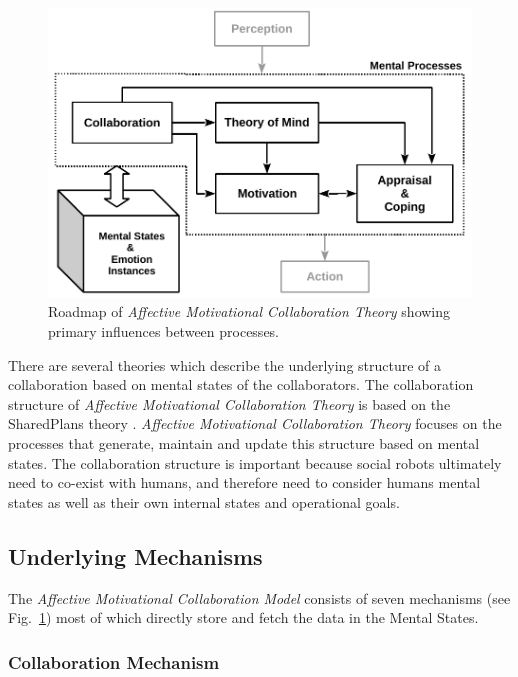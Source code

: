 \begin{figure}[h!]
  \includegraphics[scale=0.78]{figure/theory-general-croped.pdf}
  \caption{Roadmap of \textit{Affective Motivational Collaboration Theory}
  showing primary influences between processes.}
  \label{fig:theory}
\end{figure}

There are several theories which describe the underlying structure of a
collaboration based on mental states of the collaborators. The collaboration
structure of \textit{Affective Motivational Collaboration Theory} is based on
the SharedPlans theory \cite{grosz:shared-plans}. \textit{Affective Motivational
Collaboration Theory} focuses on the processes that generate, maintain and
update this structure based on mental states. The collaboration structure is
important because social robots ultimately need to co-exist with humans, and
therefore need to consider humans mental states as well as their own internal
states and operational goals.

\subsection{Underlying Mechanisms}
\label{sec:mechanisms}

The \textit{Affective Motivational Collaboration Model} consists of seven
mechanisms (see Fig.~\ref{fig:theory}) most of which directly store and
fetch the data in the Mental States.

\subsubsection{Collaboration Mechanism}
\label{sec:collaboration-mech}

